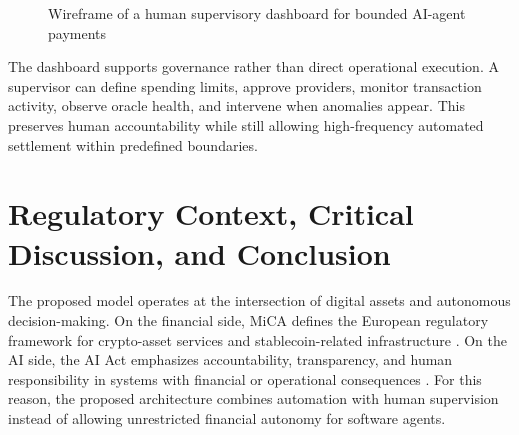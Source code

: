 \documentclass[12pt,a4paper,oneside]{article}
\theoremstyle{definition}
\theoremstyle{plain}
\begin{document}
\begin{figure}[H]
\caption{Wireframe of a human supervisory dashboard for bounded AI-agent payments}
\label{fig:dashboard_mock}
\end{figure}

The dashboard supports governance rather than direct operational execution. A supervisor can define spending limits, approve providers, monitor transaction activity, observe oracle health, and intervene when anomalies appear. This preserves human accountability while still allowing high-frequency automated settlement within predefined boundaries.

\section{Regulatory Context, Critical Discussion, and Conclusion}

The proposed model operates at the intersection of digital assets and autonomous decision-making. On the financial side, MiCA defines the European regulatory framework for crypto-asset services and stablecoin-related infrastructure \citep{europeanparliament2023mica}. On the AI side, the AI Act emphasizes accountability, transparency, and human responsibility in systems with financial or operational consequences \citep{europeanunion2024aiact}. For this reason, the proposed architecture combines automation with human supervision instead of allowing unrestricted financial autonomy for software agents.
\end{document}

